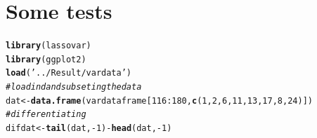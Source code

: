 \documentclass[11pt,oneside, a4paper]{amsart}\usepackage[]{graphicx}\usepackage[]{color}
\makeatletter
\newcommand{\hlnum}[1]{\textcolor[rgb]{0.686,0.059,0.569}{#1}}%
\newcommand{\hlstr}[1]{\textcolor[rgb]{0.192,0.494,0.8}{#1}}%
\newcommand{\hlcom}[1]{\textcolor[rgb]{0.678,0.584,0.686}{\textit{#1}}}%
\newcommand{\hlopt}[1]{\textcolor[rgb]{0,0,0}{#1}}%
\newcommand{\hlstd}[1]{\textcolor[rgb]{0.345,0.345,0.345}{#1}}%
\newcommand{\hlkwb}[1]{\textcolor[rgb]{0.69,0.353,0.396}{#1}}%
\newcommand{\hlkwd}[1]{\textcolor[rgb]{0.737,0.353,0.396}{\textbf{#1}}}%
\newenvironment{kframe}{%
 \def\at@end@of@kframe{}%
 \ifinner\ifhmode%
  \def\at@end@of@kframe{\end{minipage}}%
  \begin{minipage}{\columnwidth}%
 \fi\fi%
 \def\FrameCommand##1{\hskip\@totalleftmargin \hskip-\fboxsep
 \colorbox{shadecolor}{##1}\hskip-\fboxsep
     \hskip-\linewidth \hskip-\@totalleftmargin \hskip\columnwidth}%
 \MakeFramed {\advance\hsize-\width
   \@totalleftmargin\z@ \linewidth\hsize
   \@setminipage}}%
 {\par\unskip\endMakeFramed%
 \at@end@of@kframe}
\newenvironment{knitrout}{}{} %
\makeatother
\begin{document}
\section*{Some tests}


\begin{knitrout}
\color{fgcolor}\begin{kframe}
\begin{alltt}
\hlkwd{library}\hlstd{(lassovar)}
\hlkwd{library}\hlstd{(ggplot2)}
\hlkwd{load}\hlstd{(}\hlstr{'../Result/vardata'}\hlstd{)}
\hlcom{# loadind and subseting the data}
\hlstd{dat} \hlkwb{<-} \hlkwd{data.frame}\hlstd{(vardataframe[}\hlnum{116}\hlopt{:}\hlnum{180}\hlstd{,} \hlkwd{c}\hlstd{(}\hlnum{1}\hlstd{,}\hlnum{2}\hlstd{,}\hlnum{6}\hlstd{,}\hlnum{11}\hlstd{,}\hlnum{13}\hlstd{,}\hlnum{17}\hlstd{,}\hlnum{8}\hlstd{,}\hlnum{24}\hlstd{) ])}
\hlcom{# differentiating}
\hlstd{difdat} \hlkwb{<-} \hlkwd{tail}\hlstd{(dat,}\hlopt{-}\hlnum{1}\hlstd{)} \hlopt{-} \hlkwd{head}\hlstd{(dat,}\hlopt{-}\hlnum{1}\hlstd{)}
\end{alltt}
\end{kframe}
\end{knitrout}
\end{document}
